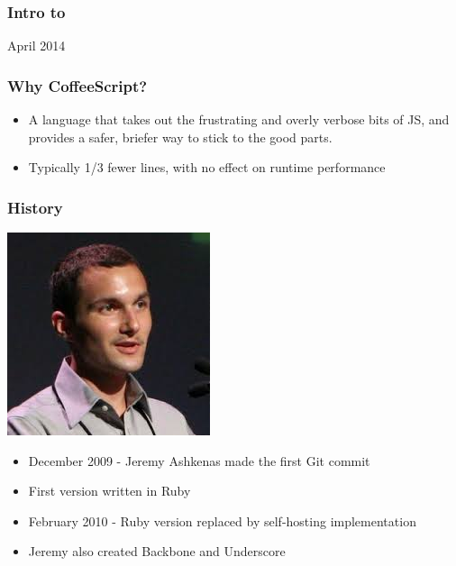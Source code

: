 \documentclass{beamer}
\begin{document}
\begin{frame}
  \frametitle{Intro to}

  April 2014

\end{frame}

\begin{frame}
  \frametitle{Why CoffeeScript?}
  \begin{itemize}
    \pause
    \item A language that takes out the frustrating and overly verbose bits of JS, and provides a safer, briefer way to stick to the good parts.
      \pause
    \item  Typically 1/3 fewer lines, with no effect on runtime performance
  \end{itemize}
\end{frame}

\begin{frame}
  \frametitle{History}
  \includegraphics[scale=.60]{jeremy}  
  \begin{itemize}
    \item December 2009 - Jeremy Ashkenas made the first Git commit
      \pause
    \item First version written in Ruby
      \pause
    \item February 2010 - Ruby version replaced by self-hosting
      implementation
      \pause
    \item Jeremy also created Backbone and Underscore
  \end{itemize}  
\end{frame}
\end{document}
